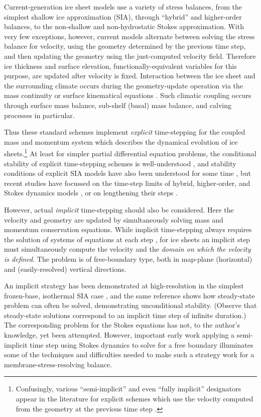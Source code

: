 \documentclass[twocolumn,letterpaper]{igs}
\begin{document}
Current-generation ice sheet models use a variety of stress balances, from the simplest shallow ice approximation (SIA), through ``hybrid'' \citep{Robinsonetal2022,Winkelmannetal2011} and higher-order balances, to the non-shallow and non-hydrostatic Stokes approximation.  With very few exceptions, however, current models alternate between solving the stress balance for velocity, using the geometry determined by the previous time step, and then updating the geometry using the just-computed velocity field.  Therefore ice thickness and surface elevation, functionally-equivalent variables for this purpose, are updated after velocity is fixed.  Interaction between the ice sheet and the surrounding climate occurs during the geometry-update operation via the mass continuity or surface kinematical equations \citep{GreveBlatter2009}.  Such climatic coupling occurs through surface mass balance, sub-shelf (basal) mass balance, and calving processes in particular.

Thus these standard schemes implement \emph{explicit} time-stepping for the coupled mass and momentum system which describes the dynamical evolution of ice sheets.\footnote{Confusingly, various ``semi-implicit'' and even ``fully implicit'' designators appear in the literature for explicit schemes which use the velocity computed from the geometry at the previous time step \citep[for example]{Chengetal2017}.}  At least for simpler partial differential equation problems, the conditional stability of explicit time-stepping schemes is well-understood \citep{LeVeque2007}, and stability conditions of explicit SIA models have also been understood for some time \citep{HindmarshPayne1996}, but recent studies have focussed on the time-step limits of hybrid, higher-order, and Stokes dynamics models \citep{Chengetal2017,Robinsonetal2022}, or on lengthening their steps \citep{LofgrenAhlkronaHelanow2021}.

However, actual \emph{implicit} time-stepping \citep{Bueler2021,LeVeque2007} should also be considered.  Here the velocity and geometry are updated by simultaneously solving mass and momentum conservation equations.  While implicit time-stepping always requires the solution of systems of equations at each step \citep{LeVeque2007}, for ice sheets an implicit step must simultaneously compute the velocity and the \emph{domain on which the velocity is defined}.  The problem is of free-boundary type, both in map-plane (horizontal) \citep{SchoofHewitt2013} and (easily-resolved) vertical directions.

An implicit strategy has been demonstrated at high-resolution in the simplest frozen-base, isothermal SIA case \citep{Bueler2016}, and the same reference shows how steady-state problem \citep[compare][]{JouvetBueler2012} can often be solved, demonstrating unconditional stability.  (Observe that steady-state solutions correspond to an implicit time step of infinite duration.)  The corresponding problem for the Stokes equations has not, to the author's knowledge, yet been attempted.  However, important early work applying a semi-implicit time step using Stokes dynamics \citep{WirbelJarosch2020} to solve for a free boundary illuminates some of the techniques and difficulties needed to make such a strategy work for a membrane-stress-resolving balance.
\end{document}
